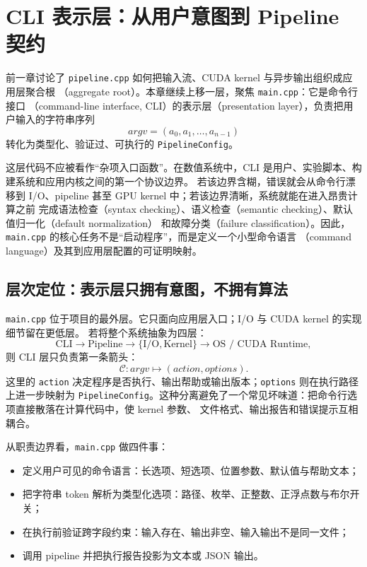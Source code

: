 \section{CLI 表示层：从用户意图到 Pipeline 契约}

前一章讨论了 \texttt{pipeline.cpp} 如何把输入流、CUDA kernel 与异步输出组织成应用层聚合根
（aggregate root）。本章继续上移一层，聚焦 \texttt{main.cpp}：它是命令行接口
（command-line interface, CLI）的表示层（presentation layer），负责把用户输入的字符串序列
\[
    argv = (a_0,a_1,\ldots,a_{n-1})
\]
转化为类型化、验证过、可执行的 \texttt{PipelineConfig}。

这层代码不应被看作“杂项入口函数”。在数值系统中，CLI 是用户、实验脚本、构建系统和应用内核之间的第一个协议边界。
若该边界含糊，错误就会从命令行漂移到 I/O、pipeline 甚至 GPU kernel 中；若该边界清晰，系统就能在进入昂贵计算之前
完成语法检查（syntax checking）、语义检查（semantic checking）、默认值归一化（default normalization）
和故障分类（failure classification）。因此，\texttt{main.cpp} 的核心任务不是“启动程序”，而是定义一个小型命令语言
（command language）及其到应用层配置的可证明映射。

\subsection{层次定位：表示层只拥有意图，不拥有算法}

\texttt{main.cpp} 位于项目的最外层。它只面向应用层入口；I/O 与 CUDA kernel 的实现细节留在更低层。
若将整个系统抽象为四层：
\[
    \text{CLI}
    \longrightarrow
    \text{Pipeline}
    \longrightarrow
    \{\text{I/O},\text{Kernel}\}
    \longrightarrow
    \text{OS / CUDA Runtime},
\]
则 CLI 层只负责第一条箭头：
\[
    \mathcal{C}: argv \mapsto (action, options).
\]
这里的 \texttt{action} 决定程序是否执行、输出帮助或输出版本；\texttt{options} 则在执行路径上进一步映射为
\texttt{PipelineConfig}。这种分离避免了一个常见坏味道：把命令行选项直接散落在计算代码中，使 kernel 参数、
文件格式、输出报告和错误提示互相耦合。

从职责边界看，\texttt{main.cpp} 做四件事：
\begin{itemize}
    \item 定义用户可见的命令语言：长选项、短选项、位置参数、默认值与帮助文本；
    \item 把字符串 token 解析为类型化选项：路径、枚举、正整数、正浮点数与布尔开关；
    \item 在执行前验证跨字段约束：输入存在、输出非空、输入输出不是同一文件；
    \item 调用 pipeline 并把执行报告投影为文本或 JSON 输出。
\end{itemize}

